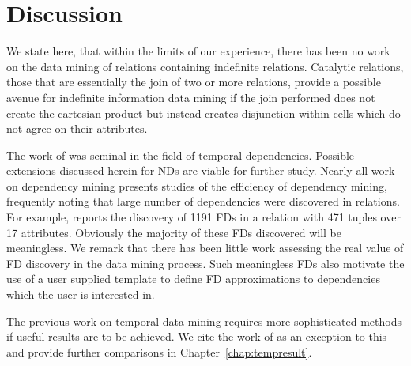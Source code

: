 \section{Discussion}


We state here, that within the limits of our experience, there has
been no work on the data mining of relations containing indefinite
relations. Catalytic relations, those that are essentially the join of
two or more relations, provide a possible avenue for indefinite
information data mining if the join performed does not create the
cartesian product but instead creates disjunction within cells which
do not agree on their attributes.

\medskip

The work of \cite{Via87,Via88} was seminal in the field of temporal
dependencies. Possible extensions discussed herein for NDs are viable
for further study. Nearly all work on dependency mining
\cite{Mann92,km95,sf93,bb95,hkp98} presents studies of the efficiency
of dependency mining, frequently noting that large number of
dependencies were discovered in relations. For example, \cite{sf93}
reports the discovery of 1191 FDs in a relation with 471 tuples over
17 attributes. Obviously the majority of these FDs discovered will be
meaningless. We remark that there has been little work assessing the
real value of FD discovery in the data mining process. Such
meaningless FDs also motivate the use of a user supplied template to
define FD approximations to dependencies which the user is interested
in. 

\medskip

The previous work on temporal data mining requires more sophisticated
methods if useful results are to be achieved. We cite the work of
\cite{dlm98} as an exception to this and provide further comparisons
in Chapter~\ref{chap:tempresult}.




